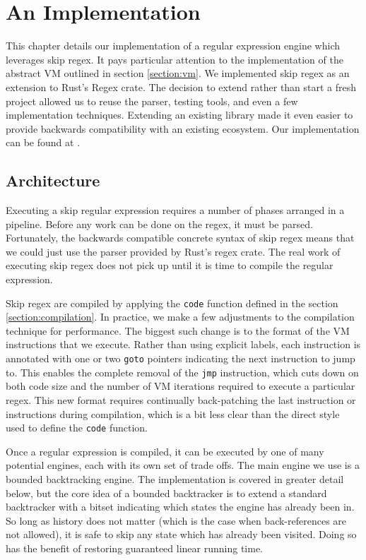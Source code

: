 \chapter{An Implementation}
\label{chapter:implementation}

This chapter details our implementation of a regular expression
engine which leverages skip regex. It pays particular attention
to the implementation of the abstract VM outlined in section
\ref{section:vm}. We implemented skip regex as
an extension to Rust's Regex crate. The decision to extend rather
than start a fresh project allowed us to reuse the parser,
testing tools, and even a few implementation techniques. Extending
an existing library made it even easier to provide backwards
compatibility with an existing ecosystem. Our implementation
can be found at \cite{PailesSkipRegex}.

\section{Architecture}

Executing a skip regular expression requires a number of phases
arranged in a pipeline. Before any work can be done on the regex,
it must be parsed. Fortunately, the backwards compatible concrete
syntax of skip regex means that we could just use the parser provided
by Rust's regex crate. The real work of executing skip regex does not
pick up until it is time to compile the regular expression.

Skip regex are compiled by applying the \verb'code' function defined
in the section \ref{section:compilation}. In practice, we make a
few adjustments to the compilation technique for performance.
The biggest such change
is to the format of the VM instructions that we execute. Rather than
using explicit labels, each instruction is annotated with one or
two \verb'goto' pointers indicating the next instruction to jump to.
This enables the complete removal of the \verb'jmp' instruction, which
cuts down on both code size and the number of VM iterations required to execute
a particular regex. This new format requires continually back-patching
the last instruction or instructions during compilation, which is a bit
less clear than the direct style used to define the \verb'code' function.

Once a regular expression is compiled, it can be executed by one
of many potential engines, each with its own set of trade offs.
The main engine we use is a bounded backtracking engine. The
implementation is covered in greater detail below, but the core
idea of a bounded backtracker is to extend a standard backtracker
with a bitset indicating which states the engine has already
been in. So long as history does not matter (which is the case
when back-references are not allowed), it is safe to skip any
state which has already been visited. Doing so has the benefit
of restoring guaranteed linear running time.

